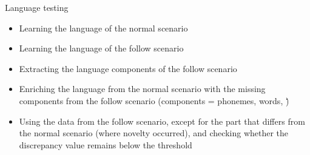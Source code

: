 \begin{frame}[allowframebreaks]{Language testing}
    
    \begin{itemize}
        \item Learning the language of the normal scenario
        \item Learning the language of the follow scenario
        \item Extracting the language components of the follow scenario
        \item Enriching the language from the normal scenario with the missing components from the follow scenario (components = phonemes, words, \.\.\.)
        \item Using the data from the follow scenario, except for the part that differs from the normal scenario (where novelty occurred), and checking whether the discrepancy value remains below the threshold
    \end{itemize}

\end{frame}